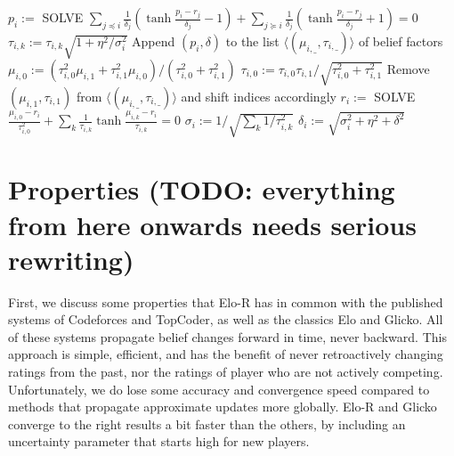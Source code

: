 \documentclass{article}
\begin{document}
\begin{algorithm}
\caption{$update()$}
\label{alg:update}
\begin{algorithmic}
\STATE $p_i := $ SOLVE $\sum_{j\preceq i}\frac{1}{\delta_j}\left( \tanh\frac {p_i - r_j} {\delta_j} - 1 \right) + \sum_{j\succeq i}\frac{1}{\delta_j}\left( \tanh\frac {p_i - r_j} {\delta_j} + 1 \right) = 0$
\ENDFOR
{}
\STATE $\tau_{i,k} := \tau_{i,k} \sqrt{1 + \eta^2/\sigma_i^2}$
\ENDFOR
\STATE Append $(p_i, \delta)$ to the list $\langle( \mu_{i,\_},\tau_{i,\_} )\rangle$ of belief factors
\STATE $\mu_{i,0} := \left( \tau_{i,0}^2 \mu_{i,1} + \tau_{i,1}^2 \mu_{i,0} \right) / \left( \tau_{i,0}^2 + \tau_{i,1}^2 \right)$
\STATE $\tau_{i,0} := \tau_{i,0}\tau_{i,1} / \sqrt{ \tau_{i,0}^2 + \tau_{i,1}^2 }$
\STATE Remove $(\mu_{i,1},\tau_{i,1})$ from $\langle( \mu_{i,\_},\tau_{i,\_} )\rangle$ and shift indices accordingly
\ENDIF
\STATE $r_i := $ SOLVE $\frac{\mu_{i,0}-r_i}{\tau_{i,0}^2} + \sum_k \frac{1}{\tau_{i,k}} \tanh \frac {\mu_{i,k}-r_i} {\tau_{i,k}} = 0$
\STATE $\sigma_i := 1 / \sqrt{\sum_k 1/\tau_{i,k}^2}$
\STATE $\delta_i := \sqrt{\sigma_i^2 + \eta^2 + \delta^2}$
\ENDFOR
\end{algorithmic}
\end{algorithm}

\section{Properties (TODO: everything from here onwards needs serious rewriting)}

First, we discuss some properties that Elo-R has in common with the published systems of Codeforces and TopCoder, as well as the classics Elo and Glicko. All of these systems propagate belief changes forward in time, never backward. This approach is simple, efficient, and has the benefit of never retroactively changing ratings from the past, nor the ratings of player who are not actively competing. Unfortunately, we do lose some accuracy and convergence speed compared to methods that propagate approximate updates more globally. Elo-R and Glicko converge to the right results a bit faster than the others, by including an uncertainty parameter that starts high for new players.
\end{document}
